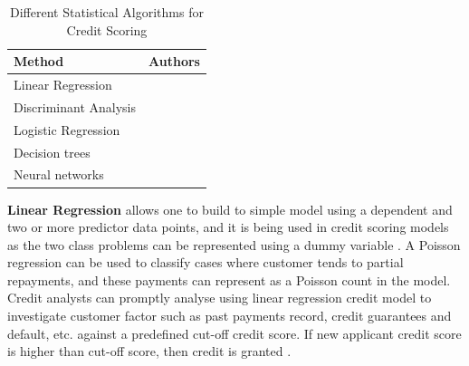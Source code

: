 {\begin{table}[!ht]
\centering
\caption{Different Statistical Algorithms for Credit Scoring}
\label{my-label}
\begin{tabular}{|p{3cm}|p{10cm}|}
\toprule
\textbf{Method}                & \textbf{Authors}                                                                                                                                                       \\ \midrule
Linear Regression     & \cite{lee2005two,10.2307/2983268}                                                                                                                          \\
Discriminant Analysis & \cite{fisher1936use,durand1941risk,altman1968financial,eisenbeis1978problems,zhou2016research,liberati2017advances}                                        \\
Logistic Regression   & \cite{hosmer1989best,altland1999regression,nie2011credit,abdou2008neural,bensic2005modelling,joanes1993reject}                                             \\
Decision trees        & \cite{kohavi2002data,breiman1984classification,zhang2010vertical,zekic2004small,zhou2008new,huang2007credit,xia2017boosted,koh2015two,koutanaei2015hybrid} \\
Neural networks       & \cite{demuth2008neural,west2000neural,gately1995neural,presky1996functional,ghosh1994credit,desai1996comparison}                                           \\ \bottomrule
\end{tabular}
\end{table}
\textbf{Linear Regression} allows one to build to simple model using a dependent and two or more predictor data points, and it is being used in credit scoring models as the two class problems can be represented using a dummy variable \citep{lee2005two}. A Poisson regression can be used to classify cases where customer tends to partial repayments, and these payments can represent as a Poisson count in the model. Credit analysts can promptly analyse using linear regression credit model to investigate customer factor such as past payments record, credit guarantees and default, etc. against a predefined cut-off credit score. If new applicant credit score is higher than cut-off score, then credit is granted \citep{10.2307/2983268}.\\

}
